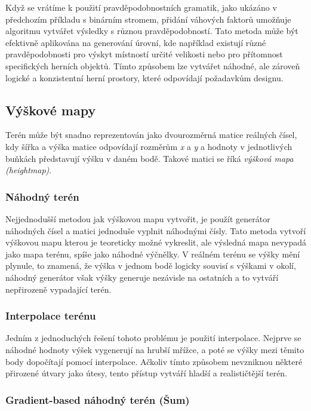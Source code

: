 Když se vrátíme k použití pravděpodobnostních gramatik, jako ukázáno v předchozím příkladu s binárním stromem, přidání váhových faktorů umožňuje algoritmu vytvářet výsledky s různou pravděpodobností. Tato metoda může být efektivně aplikována na generování úrovní, kde například existují různé pravděpodobnosti pro výskyt místností určité velikosti nebo pro přítomnost specifických herních objektů. Tímto způsobem lze vytvářet náhodné, ale zároveň logické a konzistentní herní prostory, které odpovídají požadavkům designu. \cite{PCGclanek}



\subsection{Výškové mapy}

Terén může být snadno reprezentován jako dvourozměrná matice reálných čísel, kdy šířka a výška matice odpovídají rozměrům \textit{x} a \textit{y} a hodnoty v jednotlivých buňkách představují výšku v daném bodě. Takové matici se říká \textit{výšková mapa (heightmap)}. \cite{NoiseClanek}

\subsubsection{Náhodný terén}

Nejjednodušší metodou jak výškovou mapu vytvořit, je použít generátor náhodných čísel a matici jednoduše vyplnit náhodnými čísly. Tato metoda vytvoří výškovou mapu kterou je teoreticky možné vykreslit, ale výsledná mapa nevypadá jako mapa terénu, spíše jako náhodné výčnělky. V reálném terénu se výšky mění plynule, to znamená, že výška v jednom bodě logicky souvisí s výškami v okolí, náhodný generátor však výšky generuje nezávisle na ostatních a to vytváří nepřirozeně vypadající terén. 

\subsubsection{Interpolace terénu}

Jedním z jednoduchých řešení tohoto problému je použití interpolace. Nejprve se náhodné hodnoty výšek vygenerují na hrubší mřížce, a poté se výšky mezi těmito body dopočítají pomocí interpolace. Ačkoliv tímto způsobem nevzniknou některé přirozené útvary jako útesy, tento přístup vytváří hladší a realističtější terén.

\subsubsection{Gradient-based náhodný terén (Šum)}

